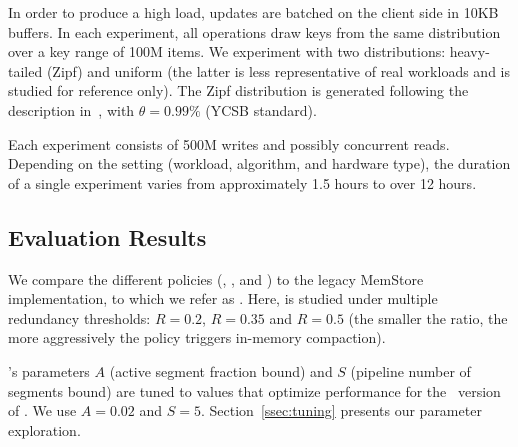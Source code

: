 In order to produce a high load, updates are batched on the client side in 10KB buffers. 
In each experiment, all operations draw keys from the same distribution over a key range
of 100M items. We experiment with two distributions: heavy-tailed (Zipf) and uniform (the latter 
is less representative of real workloads and is studied for reference only). The Zipf distribution 
is generated following the description in~\cite{Gray:1994:QGB:191839.191886}, with $\theta=0.99\%$ 
(YCSB standard).

Each experiment consists of 500M writes and possibly concurrent reads. 
Depending on the setting (workload, algorithm, and hardware type), 
the duration of 
a single experiment  varies from approximately 1.5 hours to over 12 hours.  

\subsection{Evaluation Results}
\label{ssec:results}

We compare the different \sys\/ policies (\basic, \eager, and \adp\/) to the legacy MemStore implementation, to which we refer as 
\none. Here, \adp\/ is studied under multiple 
redundancy thresholds: $R=0.2$, $R=0.35$ and $R=0.5$ (the smaller the ratio, the more aggressively
the policy triggers in-memory compaction).  

\sys's parameters  $A$ (active segment fraction bound) and $S$ (pipeline number of segments bound)  
are tuned to values that optimize performance for the \basic\ version of \sys. We use $A=0.02$ and $S=5$.
Section~\ref{ssec:tuning} presents our parameter exploration. 

